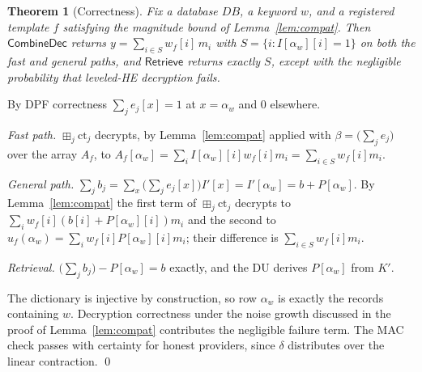 \documentclass[a4paper,fleqn]{cas-dc}
\newtheorem{theorem}{Theorem}
\newcommand{\bplus}{\boxplus}
\begin{document}
\begin{theorem}[Correctness]
\label{thm:correct}
Fix a database $DB$, a keyword $w$, and a registered template $f$ satisfying
the magnitude bound of Lemma~\ref{lem:compat}. Then $\mathsf{CombineDec}$
returns $y=\sum_{i\in S} w_f[i]\,m_i$ with $S=\{i: I[\alpha_w][i]=1\}$ on both
the fast and general paths, and $\mathsf{Retrieve}$ returns exactly $S$,
except with the negligible probability that leveled-HE decryption fails.
\end{theorem}
\begin{pf}
By DPF correctness $\sum_j e_j[x]=1$ at $x=\alpha_w$ and $0$ elsewhere.

\emph{Fast path.} $\bplus_j\text{ct}_j$ decrypts, by Lemma~\ref{lem:compat}
applied with $\beta=\big(\sum_j e_j\big)$ over the array $A_f$, to
$A_f[\alpha_w]=\sum_i I[\alpha_w][i]w_f[i]m_i=\sum_{i\in S}w_f[i]m_i$.

\emph{General path.} $\sum_j b_j=\sum_x\big(\sum_j e_j[x]\big)
I'[x]=I'[\alpha_w]=b+P[\alpha_w]$. By Lemma~\ref{lem:compat} the first term of
$\bplus_j \text{ct}_j$ decrypts to $\sum_i w_f[i](b[i]+P[\alpha_w][i])m_i$ and
the second to $u_f(\alpha_w)=\sum_i w_f[i]P[\alpha_w][i]m_i$; their difference
is $\sum_{i\in S}w_f[i]m_i$.

\emph{Retrieval.} $\big(\sum_j b_j\big)-P[\alpha_w]=b$ exactly, and the DU
derives $P[\alpha_w]$ from $K'$.

The dictionary is injective by construction, so row $\alpha_w$ is exactly the
records containing $w$. Decryption correctness under the noise growth
discussed in the proof of Lemma~\ref{lem:compat} contributes the negligible
failure term. The MAC check passes with certainty for honest providers, since
$\delta$ distributes over the linear contraction. \qed
\end{pf}
\end{document}
